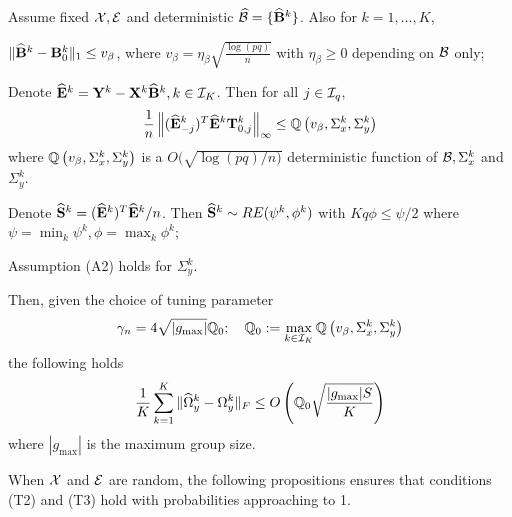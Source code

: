 \begin{Theorem}\label{thm:ThetaThm}
Assume fixed ${\cal{X}}, {\cal{E}}$ and deterministic $\widehat {{\cal{B}}} = \{ \widehat {{\mathbf{B}}}^k \}$. Also for $k = 1, \ldots, K$,

 $\| \widehat {{\mathbf{B}}}^k - {\mathbf{B}}^k_0 \|_1 \leq v_\beta$, where $v_\beta = \eta_\beta \sqrt{\frac{\log (pq)}{n}}$ with $\eta_\beta \geq 0$ depending on ${\cal{B}}$ only;


 Denote \textbf{$\widehat {{\mathbf{E}}}^k = {\mathbf{Y}}^k - {\mathbf{X}}^k \widehat {{\mathbf{B}}}^k, k \in {\cal{I}}_K$}. Then for all $j \in {\cal{I}}_q$,
%
$$
\frac{1}{n} \left\| (\widehat {{\mathbf{E}}}_{-j}^k)^T \widehat {{\mathbf{E}}}^k {\mathbf{T}}_{0,j}^k \right\|_\infty \leq
{\mathbb{Q}} \left(v_\beta, \Sigma_x^k, \Sigma_y^k \right)
$$
%
where ${\mathbb{Q}} \left(v_\beta, \Sigma_x^k, \Sigma_y^k \right)$ is a $O(\sqrt{ \log (pq)/ n)}$ deterministic function of ${\cal{B}}, \Sigma_x^k$ and $\Sigma_y^k$.

 Denote $\widehat {{\mathbf{S}}}^k = (\widehat {{\mathbf{E}}}^k)^T \widehat {{\mathbf{E}}}^k/n$. Then $\widehat {{\mathbf{S}}}^k \sim RE(\psi^k, \phi^k)$ with $Kq \phi \leq \psi/2$ where $ \psi = \min_k \psi^k, \phi = \max_k \phi^k $;

 Assumption (A2) holds for $\Sigma_y^k$.

Then, given the choice of tuning parameter
%
$$
\gamma_n = 4 \sqrt{| g_{\max}|} {\mathbb{Q}}_0; \quad {\mathbb{Q}}_0 := \max_{k \in {\cal{I}}_K} {\mathbb{Q}} \left(v_\beta, \Sigma_x^k, \Sigma_y^k \right)
$$
%
the following holds
%
\begin{align*}
\frac{1}{K} \sum_{k=1}^K \| \widehat \Omega_y^k - \Omega_y^k \|_F \leq
O \left( {\mathbb{Q}}_0 \sqrt{\frac{| g_{\max}| S}{K}} \right)
\end{align*}
%
where $|g_{\max}|$ is the maximum group size.

%
\end{Theorem}

When ${\cal{X}}$ and ${\cal{E}}$ are random, the following propositions ensures that conditions (T2) and (T3) hold with probabilities approaching to 1.

